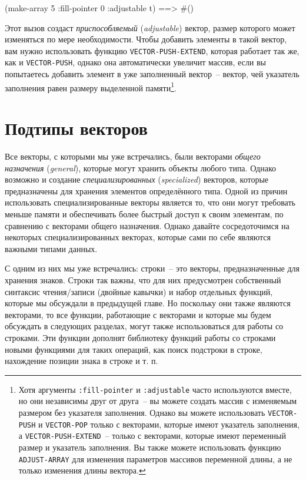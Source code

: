 \begin{myverb}
(make-array 5 :fill-pointer 0 :adjustable t) ==> #()
\end{myverb}

Этот вызов создаст \textit{приспособляемый} (\textit{adjustable}) вектор, размер которого
может изменяться по мере необходимости.  Чтобы
добавить элементы в такой вектор, вам нужно использовать функцию
\lstinline{VECTOR-PUSH-EXTEND}, которая работает так же, как и \lstinline{VECTOR-PUSH}, однако
она автоматически увеличит массив, если вы попытаетесь добавить элемент в
уже заполненный вектор~-- вектор, чей указатель заполнения равен размеру выделенной
памяти\footnote{Хотя аргументы \lstinline{:fill-pointer} и \lstinline{:adjustable} часто используются
  вместе, но они независимы друг от друга~-- вы можете создать
  массив с изменяемым размером без указателя заполнения.  Однако вы можете использовать
  \lstinline{VECTOR-PUSH} и \lstinline{VECTOR-POP} только с векторами, которые имеют указатель
  заполнения, а \lstinline{VECTOR-PUSH-EXTEND}~-- только с векторами, которые имеют переменный
  размер и указатель заполнения.  Вы также можете использовать функцию \lstinline{ADJUST-ARRAY}
  для изменения параметров массивов переменной длины, а не только изменения длины
  вектора.}.


\section{Подтипы векторов}

Все векторы, с которыми мы уже встречались, были векторами \textit{общего назначения}
(\textit{general}), которые могут хранить объекты любого типа.  Однако возможно и
создание \textit{специализированных} (\textit{specialized}) векторов,
которые предназначены для хранения элементов определённого типа.  Одной из
причин использовать специализированные векторы является то, что они могут требовать
меньше памяти и обеспечивать более быстрый доступ к своим элементам, по сравнению с
векторами общего назначения.  Однако давайте сосредоточимся на некоторых
специализированных векторах, которые сами по себе являются важными типами данных.

С одним из них мы уже встречались: строки~-- это векторы, предназначенные для хранения
знаков.  Строки так важны, что для них предусмотрен собственный синтаксис чтения/записи
(двойные кавычки) и набор отдельных функций, которые мы обсуждали в предыдущей главе.  Но
поскольку они также являются векторами, то все функции, работающие с векторами и которые мы
будем обсуждать в следующих разделах, могут также использоваться для работы со строками.
Эти функции дополнят библиотеку функций работы со строками новыми функциями для таких
операций, как поиск подстроки в строке, нахождение позиции знака в строке и т. п.

